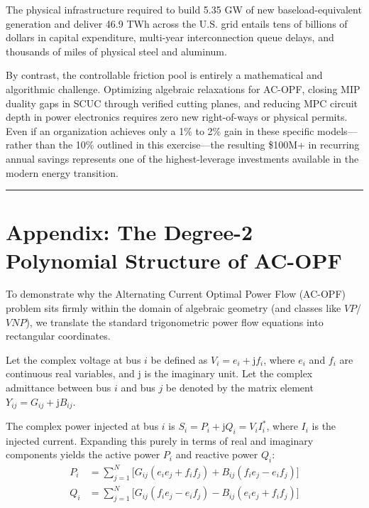 \documentclass[11pt, a4paper]{article}
\begin{document}
The physical infrastructure required to build 5.35 GW of new baseload-equivalent generation and deliver 46.9 TWh across the U.S. grid entails tens of billions of dollars in capital expenditure, multi-year interconnection queue delays, and thousands of miles of physical steel and aluminum. 

By contrast, the controllable friction pool is entirely a mathematical and algorithmic challenge. Optimizing algebraic relaxations for AC-OPF, closing MIP duality gaps in SCUC through verified cutting planes, and reducing MPC circuit depth in power electronics requires zero new right-of-ways or physical permits. Even if an organization achieves only a 1\% to 2\% gain in these specific models—rather than the 10\% outlined in this exercise—the resulting \$100M+ in recurring annual savings represents one of the highest-leverage investments available in the modern energy transition.

\vspace{2em}
\hrule
\vspace{1em}

\appendix
\section{Appendix: The Degree-2 Polynomial Structure of AC-OPF}

To demonstrate why the Alternating Current Optimal Power Flow (AC-OPF) problem sits firmly within the domain of algebraic geometry (and classes like $VP$/$VNP$), we translate the standard trigonometric power flow equations into rectangular coordinates.

Let the complex voltage at bus $i$ be defined as $V_i = e_i + \mathrm{j}f_i$, where $e_i$ and $f_i$ are continuous real variables, and $\mathrm{j}$ is the imaginary unit. Let the complex admittance between bus $i$ and bus $j$ be denoted by the matrix element $Y_{ij} = G_{ij} + \mathrm{j}B_{ij}$.

The complex power injected at bus $i$ is $S_i = P_i + \mathrm{j}Q_i = V_i I_i^*$, where $I_i$ is the injected current. Expanding this purely in terms of real and imaginary components yields the active power $P_i$ and reactive power $Q_i$:
\begin{align}
    P_i &= \sum_{j=1}^{N} \Big[ G_{ij}(e_i e_j + f_i f_j) + B_{ij}(f_i e_j - e_i f_j) \Big] \\
    Q_i &= \sum_{j=1}^{N} \Big[ G_{ij}(f_i e_j - e_i f_j) - B_{ij}(e_i e_j + f_i f_j) \Big]
\end{align}
\end{document}
